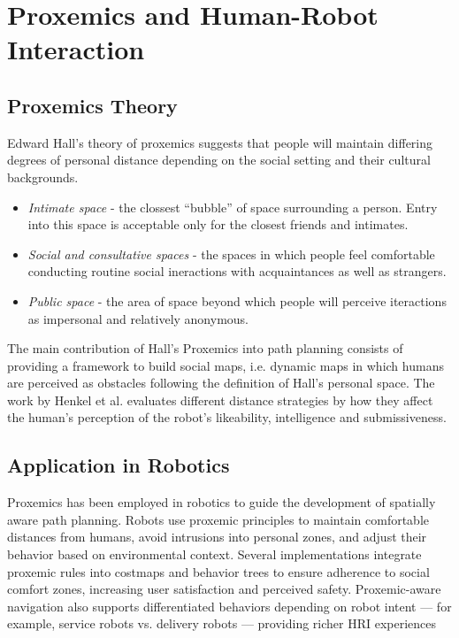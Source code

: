 
\section{Proxemics and Human-Robot Interaction}



\subsection{Proxemics Theory}
Edward Hall's theory of proxemics \cite{proxemicstheoryHall} suggests
that people will maintain differing degrees of personal distance depending on the 
social setting and their cultural backgrounds. 
\begin{itemize}
    \item \textit{Intimate space} - the clossest ``bubble'' of space surrounding a person.
    Entry into this space is acceptable only for the closest friends and intimates.
    \item \textit{Social and consultative spaces} - the spaces in which people feel 
    comfortable conducting routine social ineractions with acquaintances as well as 
    strangers.
    \item \textit{Public space} - the area of space beyond which people will perceive 
    iteractions as impersonal and relatively anonymous.
\end{itemize}
The main contribution of Hall's Proxemics into path planning consists of providing a 
framework to build social maps, i.e. dynamic maps in which humans are perceived 
as obstacles following the definition of Hall's personal space.   
The work by Henkel et al. \cite{henkel} evaluates different distance strategies by how 
they affect the human's perception of the robot's likeability, intelligence and submissiveness.

\subsection{Application in Robotics}
Proxemics has been employed in robotics to guide the development of spatially aware path 
planning. Robots use proxemic principles to maintain comfortable distances from humans, 
avoid intrusions into personal zones, and adjust their behavior based on environmental 
context. Several implementations integrate proxemic rules into costmaps and behavior 
trees to ensure adherence to social comfort zones, increasing user satisfaction and 
perceived safety. Proxemic-aware navigation also supports differentiated behaviors 
depending on robot intent — for example, service robots vs. delivery robots — providing 
richer HRI experiences

